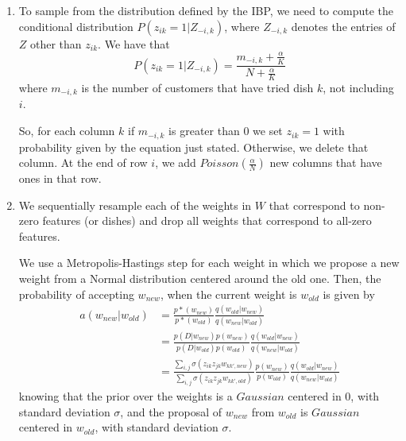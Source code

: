 \documentclass[]{article}
\begin{document}
	\begin{enumerate}
		\item To sample from the distribution defined by the IBP, we need to compute the conditional distribution $P(z_{ik}=1|Z_{-i,k})$, where $Z_{-i,k}$ denotes the entries of $Z$ other than $z_{ik}$. We have that
		$$
		P(z_{ik}=1|Z_{-i,k}) = \frac{m_{-i,k}+\frac{\alpha}{K}}{N+\frac{\alpha}{K}}
		$$
		where $m_{-i,k}$ is the number of customers that have tried dish $k$, not including $i$.
		
		So, for each column $k$ if $m_{-i,k}$  is greater than 0 we set $z_{ik}=1$ with probability given by the equation just stated. Otherwise, we delete that column. At the end of row $i$, we add $Poisson(\frac{\alpha}{N})$ new columns that have ones in that row. 
		\item We sequentially resample each of the weights in $W$ that correspond to non-zero features (or dishes) and drop all weights that correspond to all-zero features. 
		
		We use a Metropolis-Hastings step for each weight in which we propose a new weight from a Normal distribution centered around the old one. Then, the probability of accepting $w_{new}$, when the current weight is $w_{old}$ is given by
		\begin{align*}
		a(w_{new}|w_{old}) & = \frac{p*(w_{new})}{p*(w_{old})} \frac{q(w_{old}|w_{new})}{q(w_{new}|w_{old})} \\
		& = \frac{p(D|w_{new})p(w_{new})}{p(D|w_{old})p(w_{old})} \frac{q(w_{old}|w_{new})}{q(w_{new}|w_{old})} \\
		& = \frac{\sum_{i,j}\sigma(z_{ik}z_{jk}w_{kk',new})}{\sum_{i,j}\sigma(z_{ik}z_{jk}w_{kk',old})}\frac{p(w_{new})}{p(w_{old})}\frac{q(w_{old}|w_{new})}{q(w_{new}|w_{old})}
		\end{align*}
		knowing that the prior over the weights is a $Gaussian$ centered in 0, with standard deviation $\sigma$, and the proposal of $w_{new}$ from $w_{old}$ is  $Gaussian$ centered in $w_{old}$, with standard deviation $\sigma$.
	\end{enumerate}
	
\end{document}
